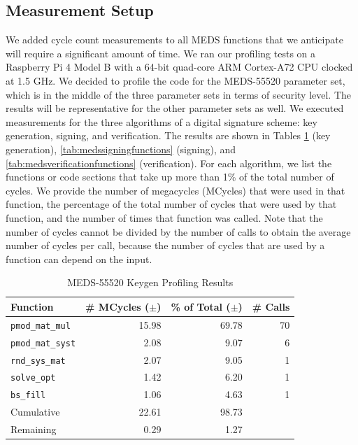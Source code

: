 \documentclass[11pt,a4paper]{report}
\theoremstyle{definition}
\begin{document}
\subsection{Measurement Setup}
We added cycle count measurements to all MEDS functions that we anticipate will require a significant amount of time. We ran our profiling tests on a Raspberry Pi 4 Model B with a 64-bit quad-core ARM Cortex-A72 CPU clocked at 1.5 GHz. We decided to profile the code for the MEDS-55520 parameter set, which is in the middle of the three parameter sets in terms of security level. The results will be representative for the other parameter sets as well. We executed measurements for the three algorithms of a digital signature scheme: key generation, signing, and verification. The results are shown in Tables \ref{tab:medskeygenfunctions} (key generation), \ref{tab:medssigningfunctions} (signing), and \ref{tab:medsverificationfunctions} (verification). For each algorithm, we list the functions or code sections that take up more than 1\% of the total number of cycles. We provide the number of megacycles (MCycles) that were used in that function, the percentage of the total number of cycles that were used by that function, and the number of times that function was called. Note that the number of cycles cannot be divided by the number of calls to obtain the average number of cycles per call, because the number of cycles that are used by a function can depend on the input.

\begin{table}[]
  \centering
  \begin{tabular}{lrrr}
    \toprule
    \textbf{Function} & \textbf{\# MCycles} ($\pm$) & \textbf{\% of Total} ($\pm$) & \textbf{\# Calls} \\
    \midrule
      \texttt{pmod\_mat\_mul} & 15.98 & 69.78 & 70 \\
      \texttt{pmod\_mat\_syst} & 2.08 & 9.07 & 6 \\
      \texttt{rnd\_sys\_mat} & 2.07 & 9.05 & 1 \\
      \texttt{solve\_opt} & 1.42 & 6.20 & 1 \\
      \texttt{bs\_fill} & 1.06 & 4.63 & 1 \\
    \midrule
      Cumulative & 22.61 & 98.73 & \\
      Remaining & 0.29 & 1.27 & \\
    \bottomrule
  \end{tabular}
  \caption{MEDS-55520 Keygen Profiling Results}
  \label{tab:medskeygenfunctions}
\end{table}
\end{document}
